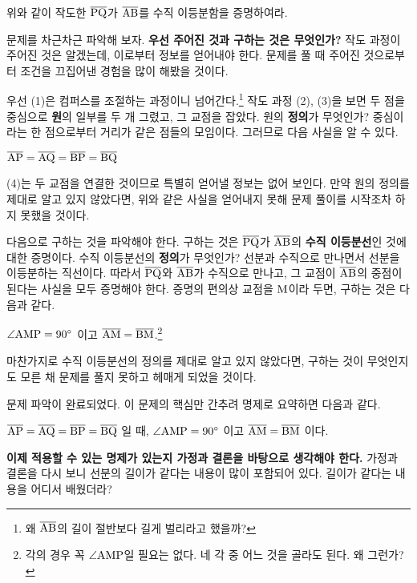 \bigskip

위와 같이 작도한 \(\overline{\rm{PQ}}\)가 \(\overline{\rm{AB}}\)를 수직 이등분함을 증명하여라.

\newpage

문제를 차근차근 파악해 보자. \textbf{우선 주어진 것과 구하는 것은 무엇인가?} 작도 과정이 주어진 것은 알겠는데, 이로부터 정보를 얻어내야 한다. 문제를 풀 때 주어진 것으로부터 조건을 끄집어낸 경험을 많이 해봤을 것이다.

우선 (1)은 컴퍼스를 조절하는 과정이니 넘어간다.\footnote{왜 \(\overline{\rm{AB}}\)의 길이 절반보다 길게 벌리라고 했을까?} 작도 과정 (2), (3)을 보면 두 점을 중심으로 \textbf{원}의 일부를 두 개 그렸고, 그 교점을 잡았다. 원의 \textbf{정의}가 무엇인가? 중심이라는 한 점으로부터 거리가 같은 점들의 모임이다. 그러므로 다음 사실을 알 수 있다.
\begin{center}
    \(\overline{\rm{AP}} = \overline{\rm{AQ}} = \overline{\rm{BP}} = \overline{\rm{BQ}}\)
\end{center}
(4)는 두 교점을 연결한 것이므로 특별히 얻어낼 정보는 없어 보인다. 만약 원의 정의를 제대로 알고 있지 않았다면, 위와 같은 사실을 얻어내지 못해 문제 풀이를 시작조차 하지 못했을 것이다.

다음으로 구하는 것을 파악해야 한다. 구하는 것은 \(\overline{\rm{PQ}}\)가 \(\overline{\rm{AB}}\)의 \textbf{수직 이등분선}인 것에 대한 증명이다. 수직 이등분선의 \textbf{정의}가 무엇인가? 선분과 수직으로 만나면서 선분을 이등분하는 직선이다. 따라서 \(\overline{\rm{PQ}}\)와 \(\overline{\rm{AB}}\)가 수직으로 만나고, 그 교점이 \(\overline{\rm{AB}}\)의 중점이 된다는 사실을 모두 증명해야 한다. 증명의 편의상 교점을 \(\rm{M}\)이라 두면, 구하는 것은 다음과 같다.
\begin{center}
    \(\angle \rm{AMP} = 90^\circ\) 이고 \(\overline{\rm{AM}} = \overline{\rm{BM}}\).\footnote{각의 경우 꼭 \(\angle \rm{AMP}\)일 필요는 없다. 네 각 중 어느 것을 골라도 된다. 왜 그런가?}
\end{center}
마찬가지로 수직 이등분선의 정의를 제대로 알고 있지 않았다면, 구하는 것이 무엇인지도 모른 채 문제를 풀지 못하고 헤매게 되었을 것이다.

문제 파악이 완료되었다. 이 문제의 핵심만 간추려 명제로 요약하면 다음과 같다.
\begin{center}
    \(\overline{\rm{AP}} = \overline{\rm{AQ}} = \overline{\rm{BP}} = \overline{\rm{BQ}}\) 일 때, \(\angle \rm{AMP} = 90^\circ\) 이고 \(\overline{\rm{AM}} = \overline{\rm{BM}}\) 이다.
\end{center}
\textbf{이제 적용할 수 있는 명제가 있는지 가정과 결론을 바탕으로 생각해야 한다.} 가정과 결론을 다시 보니 선분의 길이가 같다는 내용이 많이 포함되어 있다. 길이가 같다는 내용을 어디서 배웠더라?


